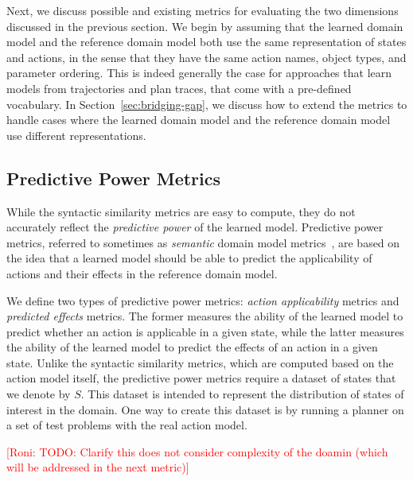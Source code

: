 \documentclass{article}
\theoremstyle{definition}
\theoremstyle{remark}
\newcommand{\roni}[1]{{\textcolor{red}{[Roni: #1]}}}
\begin{document}
Next, we discuss possible and existing metrics for evaluating the two dimensions discussed in the previous section. 
We begin by assuming that the learned domain model and the reference domain model both use the same representation of states and actions, %
in the sense that they have the same action names, object types, and parameter ordering. This is indeed generally the case for approaches that learn models from trajectories and plan traces, that come with a pre-defined vocabulary. 
In Section~\ref{sec:bridging-gap}, we discuss how to extend the metrics to handle cases where the learned domain model and the reference domain model use different representations. 



\subsection{Predictive Power Metrics}
\label{sec:predictiveness-metrics}
While the syntactic similarity metrics are easy to compute, they do not accurately reflect the \emph{predictive power} of the learned model. 
Predictive power metrics, referred to sometimes as \emph{semantic} domain model metrics~\citep{aineto2019learning,mordoch2024safe,le2024learning}, are based on the idea that a learned model should be able to predict the applicability of actions and their effects in the reference domain model. 


We define two types of predictive power metrics: \emph{action applicability} metrics and \emph{predicted effects} metrics. 
The former measures the ability of the learned model to predict whether an action is applicable in a given state, while the latter measures the ability of the learned model to predict the effects of an action in a given state.
Unlike the syntactic similarity metrics, which are computed based on the action model itself, the predictive power metrics require a dataset of states that we denote by $S$. 
This dataset is intended to represent the distribution of states of interest in the domain. 
One way to create this dataset is by running a planner on a set of test problems with the real action model.

\roni{TODO: Clarify this does not consider complexity of the doamin (which will be addressed in the next metric)}
\end{document}
